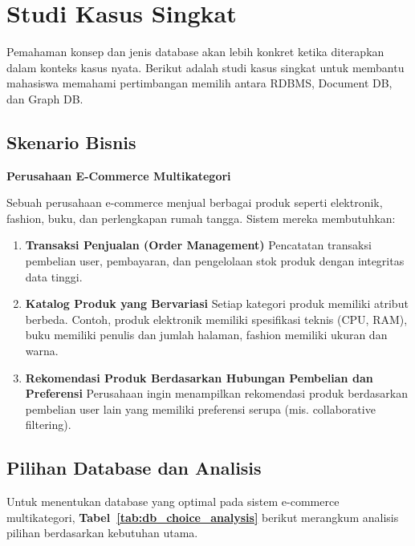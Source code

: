 \section{Studi Kasus Singkat}

Pemahaman konsep dan jenis database akan lebih konkret ketika diterapkan dalam konteks kasus nyata. Berikut adalah studi kasus singkat untuk membantu mahasiswa memahami pertimbangan memilih antara RDBMS, Document DB, dan Graph DB.

\subsection{Skenario Bisnis}

\textbf{Perusahaan E-Commerce Multikategori}

Sebuah perusahaan e-commerce menjual berbagai produk seperti elektronik, fashion, buku, dan perlengkapan rumah tangga. Sistem mereka membutuhkan:

\begin{enumerate}
	\item \textbf{Transaksi Penjualan (Order Management)}  
	Pencatatan transaksi pembelian user, pembayaran, dan pengelolaan stok produk dengan integritas data tinggi.
	
	\item \textbf{Katalog Produk yang Bervariasi}  
	Setiap kategori produk memiliki atribut berbeda. Contoh, produk elektronik memiliki spesifikasi teknis (CPU, RAM), buku memiliki penulis dan jumlah halaman, fashion memiliki ukuran dan warna.
	
	\item \textbf{Rekomendasi Produk Berdasarkan Hubungan Pembelian dan Preferensi}  
	Perusahaan ingin menampilkan rekomendasi produk berdasarkan pembelian user lain yang memiliki preferensi serupa (mis. collaborative filtering).
\end{enumerate}

\subsection{Pilihan Database dan Analisis}

Untuk menentukan database yang optimal pada sistem e-commerce multikategori, \textbf{Tabel~\ref{tab:db_choice_analysis}} berikut merangkum analisis pilihan berdasarkan kebutuhan utama.

